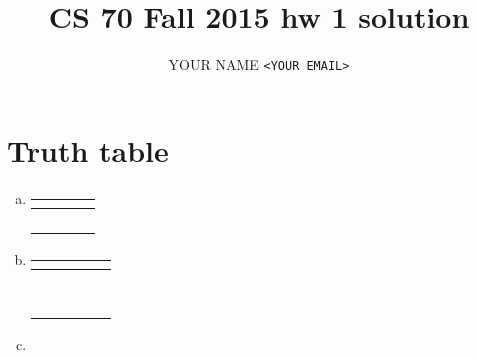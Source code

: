 \documentclass{article}
\newcommand{\myname}{YOUR NAME}
\newcommand{\myemail}{YOUR EMAIL}
\begin{document}
\setlength{\parindent}{0px}





\title{CS 70 Fall 2015 hw 1 solution}
\author{\myname{} \texttt{<\myemail>}}
\date{} %
\maketitle





\section{Truth table}
\begin{enumerate}[(a)]

    \item %

          \begin{tabu}{cc|cc}
              $  $&$  $&$  $&$  $ \\
              \hline
               &  &  &  \\
               &  &  &  \\
               &  &  &  \\
               &  &  &  \\
          \end{tabu}

    \item %

          \begin{tabu}{ccc|cc}
              $  $&$  $&$  $&$  $&$  $ \\
              \hline
                &   &   &   &   \\
                &   &   &   &   \\
                &   &   &   &   \\
                &   &   &   &   \\
                &   &   &   &   \\
                &   &   &   &   \\
                &   &   &   &   \\
                &   &   &   &   \\
          \end{tabu}

    \item %


\end{enumerate}
\end{document}
